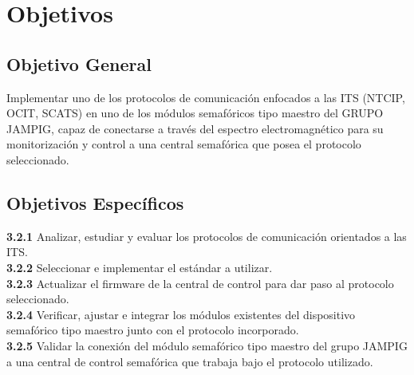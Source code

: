 \chapter{Objetivos}

\section{Objetivo General}
Implementar uno de los protocolos de comunicación enfocados a las ITS (NTCIP, OCIT, SCATS) en uno de 
los módulos semafóricos tipo maestro del GRUPO JAMPIG, capaz de conectarse a través del espectro 
electromagnético para su monitorización y control a una central semafórica que posea el protocolo seleccionado.
\section{Objetivos Específicos}

\textbf{3.2.1} Analizar, estudiar y evaluar los protocolos de comunicación orientados a las ITS.
\\
\textbf{3.2.2} Seleccionar e implementar el estándar a utilizar.
\\
\textbf{3.2.3} Actualizar el firmware de la central de control para dar paso al protocolo seleccionado.
\\
\textbf{3.2.4} Verificar, ajustar e integrar los módulos existentes del dispositivo semafórico tipo maestro junto con el protocolo incorporado.
\\
\textbf{3.2.5} Validar la conexión del módulo semafórico tipo maestro del grupo JAMPIG a una central de control semafórica que trabaja bajo el protocolo utilizado.